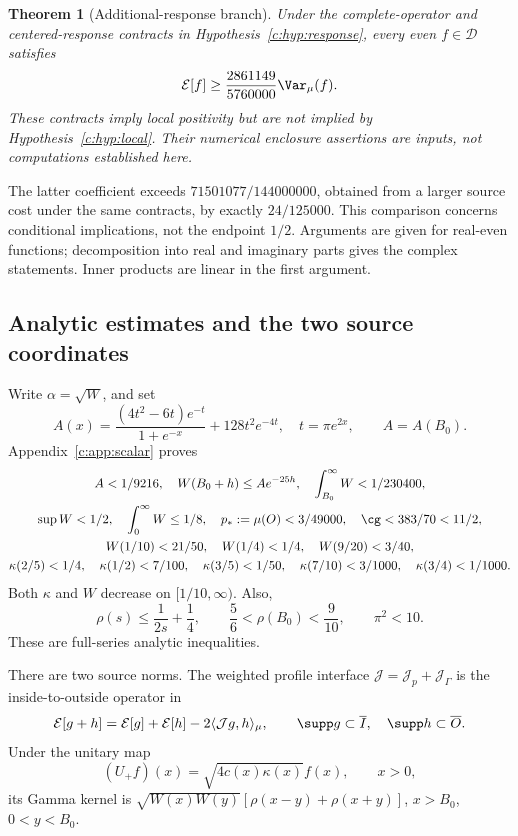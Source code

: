\documentclass[11pt,a4paper]{article}
\numberwithin{equation}{section}
\newtheorem{theorem}{Theorem}[section]
\theoremstyle{definition}\newtheorem{definition}[theorem]{Definition}
\theoremstyle{remark}\newtheorem{remark}[theorem]{Remark}
\newcommand{\E}{\mathcal E}\newcommand{\D}{\mathcal D}
\newcommand{\ip}[2]{\langle#1,#2\rangle}\newcommand{\norm}[1]{\lVert#1\rVert}\newcommand{\abs}[1]{\lvert#1\rvert}
\begin{document}
\begin{theorem}[Additional-response branch]\label{c:thm:conditionalglobal}
Under the complete-operator and centered-response contracts in Hypothesis~\ref{c:hyp:response}, every even $f\in\D$ satisfies
\begin{equation}\label{c:eq:newglobal}
 \E[f]\ge\frac{2861149}{5760000}\Var_\mu(f).
\end{equation}
These contracts imply local positivity but are not implied by Hypothesis~\ref{c:hyp:local}. Their numerical enclosure assertions are inputs, not computations established here.
\end{theorem}
The latter coefficient exceeds $71501077/144000000$, obtained from a larger source cost under the same contracts, by exactly $24/125000$. This comparison concerns conditional implications, not the endpoint $1/2$. Arguments are given for real-even functions; decomposition into real and imaginary parts gives the complex statements. Inner products are linear in the first argument. 


\subsection{Analytic estimates and the two source coordinates}\label{c:sec:estimates}
Write $\alpha=\sqrt W$, and set
\[
 A(x)=\frac{(4t^2-6t)e^{-t}}{1+e^{-x}}+128t^2e^{-4t},
 \quad t=\pi e^{2x},\qquad A=A({B_0}).
\]
Appendix~\ref{c:app:scalar} proves
\begin{gather}
 A<1/9216,\quad W({B_0}+h)\le Ae^{-25h},\quad
 \int_{B_0}^\infty W<1/230400,\label{c:eq:envelope}\\
 \sup W<1/2,\quad \int_0^\infty W\le1/8,\quad
 p_*:=\mu(O)<3/49000,\quad \cg<383/70<11/2,\label{c:eq:basiccaps}\\
 W(1/10)<21/50,\quad W(1/4)<1/4,\quad W(9/20)<3/40,\label{c:eq:pointW}\\
 \kappa(2/5)<1/4,\quad \kappa(1/2)<7/100,\quad
 \kappa(3/5)<1/50,\quad \kappa(7/10)<3/1000,\quad
 \kappa(3/4)<1/1000.\label{c:eq:pointkappa}
\end{gather}
Both $\kappa$ and $W$ decrease on $[1/10,\infty)$. Also,
\begin{equation}\label{c:eq:rhoelementary}
 \rho(s)\le\frac1{2s}+\frac14,\qquad
 \frac56<\rho({B_0})<\frac9{10},\qquad \pi^2<10.
\end{equation}
These are full-series analytic inequalities.

There are two source norms. The weighted profile interface $\mathcal J=\mathcal J_p+\mathcal J_\Gamma$ is the inside-to-outside operator in
\begin{equation}\label{c:eq:energycross}
 \E[g+h]=\E[g]+\E[h]-2\ip{\mathcal Jg}{h}_\mu,
 \qquad \supp g\subset\overline I,\quad\supp h\subset\overline O.
\end{equation}
Under the unitary map
\begin{equation}\label{c:eq:foldU}
 (U_+ f)(x)=\sqrt{4c(x)\kappa(x)}f(x),\qquad x>0,
\end{equation}
its Gamma kernel is $\sqrt{W(x)W(y)}[\rho(x-y)+\rho(x+y)]$, $x>{B_0}$, $0<y<{B_0}$.
\end{document}
